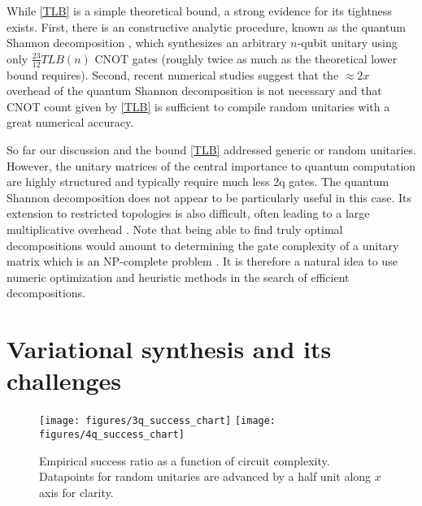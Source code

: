 \documentclass[twocolumn, amsfonts, amssymb, aps, nofootinbib]{revtex4-2}
\newcommand{\CX}{CNOT }
\begin{document}
While \eqref{TLB} is a simple theoretical bound, a strong evidence for its tightness exists. First, there is an constructive analytic procedure, known as the quantum Shannon decomposition \cite{Shende2006}, which synthesizes an arbitrary $n$-qubit unitary using only  $\frac{23}{12}TLB(n)$ \CX gates (roughly twice as much as the theoretical lower bound requires). Second, recent numerical studies \cite{Madden2021, Rakyta2021} suggest that the $\approx2x$ overhead of the quantum Shannon decomposition is not necessary and that \CX count given by \eqref{TLB} is sufficient to compile random unitaries with a great numerical accuracy.

So far our discussion and the bound \eqref{TLB} addressed generic or random unitaries. However, the unitary matrices of the central importance to quantum computation are highly structured and typically require much less 2q gates. The quantum Shannon decomposition does not appear to be particularly useful in this case. Its extension to restricted topologies is also difficult, often leading to a large multiplicative overhead \cite{Shende2006}. Note that being able to find truly optimal decompositions would amount to determining the gate complexity of a unitary matrix which is an NP-complete problem \cite{Botea2018}. It is therefore a natural idea to use numeric optimization and heuristic methods in the search of efficient decompositions.

\section{Variational synthesis and its challenges \label{sec local minimums}}

\begin{figure*}
	\texttt{[image: figures/3q\_success\_chart]}
	\texttt{[image: figures/4q\_success\_chart]}
	\caption{Empirical success ratio as a function of circuit complexity. Datapoints for random unitaries are advanced by a half unit along $x$ axis for clarity.}
	\label{fig local minumums}
\end{figure*}
\end{document}

